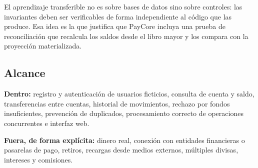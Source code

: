 El aprendizaje transferible no es sobre bases de datos sino sobre controles:
las invariantes deben ser verificables de forma independiente al código que
las produce. Esa idea es la que justifica que PayCore incluya una prueba de
reconciliación que recalcula los saldos desde el libro mayor y los compara con
la proyección materializada.

\subsection{Alcance}

\textbf{Dentro:} registro y autenticación de usuarios ficticios, consulta de
cuenta y saldo, transferencias entre cuentas, historial de movimientos,
rechazo por fondos insuficientes, prevención de duplicados, procesamiento
correcto de operaciones concurrentes e interfaz web.

\textbf{Fuera, de forma explícita:} dinero real, conexión con entidades
financieras o pasarelas de pago, retiros, recargas desde medios externos,
múltiples divisas, intereses y comisiones.

